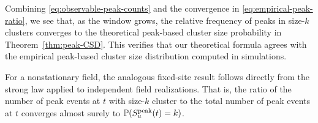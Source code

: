 \documentclass[aap,preprint]{imsart}
\theoremstyle{plain}
\newtheorem{corollary}[theorem]{Corollary}
\theoremstyle{definition}
\def\P{{\mathbb P}}
\def\Z{{\mathbb Z}}
\begin{document}
Combining \eqref{eq:observable-peak-counts} and the convergence in \eqref{eq:empirical-peak-ratio}, we see that, as the window grows, the relative frequency of peaks in size-$k$ clusters converges to the theoretical peak-based cluster size probability in Theorem~\ref{thm:peak-CSD}. This verifies that our theoretical formula agrees with the empirical
peak-based cluster size distribution computed in simulations.

For a nonstationary field, the analogous fixed-site result follows directly
from the strong law applied to independent field realizations. That is, the ratio of the number of peak events at $t$ with size-$k$ cluster to the total number of peak events at $t$ converges almost surely to
$\P(S_u^{\rm peak}(t)=k)$.

	
\end{document}
